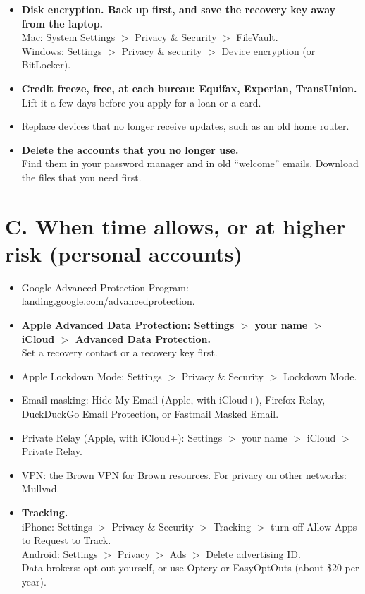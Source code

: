 \documentclass[10pt]{article}
\begin{document}
\begin{itemize}
\item \textbf{Disk encryption. Back up first, and save the recovery key away from the laptop.}\\{\small Mac: System Settings $>$ Privacy \& Security $>$ FileVault.\\ Windows: Settings $>$ Privacy \& security $>$ Device encryption (or BitLocker).}
\item \textbf{Credit freeze, free, at each bureau: Equifax, Experian, TransUnion.}\\{\small Lift it a few days before you apply for a loan or a card.}
\item Replace devices that no longer receive updates, such as an old home router.
\item \textbf{Delete the accounts that you no longer use.}\\{\small Find them in your password manager and in old ``welcome'' emails. Download the files that you need first.}
\end{itemize}
\section{C. When time allows, or at higher risk (personal accounts)}
\begin{itemize}
\item Google Advanced Protection Program: landing.google.com/advancedprotection.
\item \textbf{Apple Advanced Data Protection: Settings $>$ your name $>$ iCloud $>$ Advanced Data Protection.}\\{\small Set a recovery contact or a recovery key first.}
\item Apple Lockdown Mode: Settings $>$ Privacy \& Security $>$ Lockdown Mode.
\item Email masking: Hide My Email (Apple, with iCloud+), Firefox Relay, DuckDuckGo Email Protection, or Fastmail Masked Email.
\item Private Relay (Apple, with iCloud+): Settings $>$ your name $>$ iCloud $>$ Private Relay.
\item VPN: the Brown VPN for Brown resources. For privacy on other networks: Mullvad.
\item \textbf{Tracking.}\\{\small iPhone: Settings $>$ Privacy \& Security $>$ Tracking $>$ turn off Allow Apps to Request to Track.\\ Android: Settings $>$ Privacy $>$ Ads $>$ Delete advertising ID.\\ Data brokers: opt out yourself, or use Optery or EasyOptOuts (about \$20 per year).}
\end{itemize}
\end{document}
